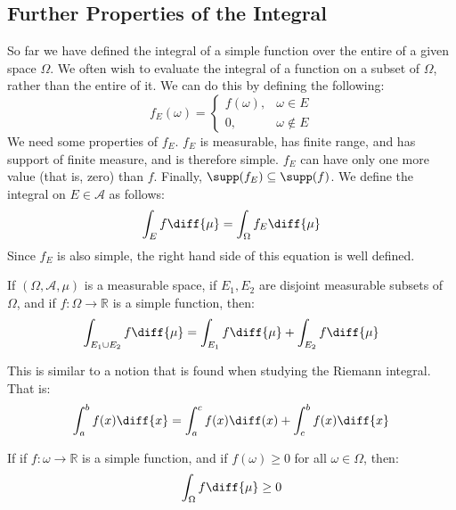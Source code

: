     \subsection{Further Properties of the Integral}
        So far we have defined the integral of a simple function over the
        entire of a given space $\Omega$. We often wish to evaluate the integral
        of a function on a subset of $\Omega$, rather than the entire of it. We
        can do this by defining the following:
        \begin{equation}
            f_{E}(\omega)=
            \begin{cases}
                f(\omega),&\omega\in{E}\\
                0,&\omega\notin{E}
            \end{cases}
        \end{equation}
        We need some properties of $f_{E}$. $f_{E}$ is measurable, has finite
        range, and has support of finite measure, and is therefore simple.
        $f_{E}$ can have only one more value (that is, zero) than $f$. Finally,
        $\supp(f_{E})\subseteq{\supp(f)}$. We define the integral on
        $E\in\mathcal{A}$ as follows:
        \begin{equation}
            \int_{E}f\diff{\mu}=\int_{\Omega}f_{E}\diff{\mu}
        \end{equation}
        Since $f_{E}$ is also simple, the right hand side of this equation is
        well defined.
        \begin{theorem}
            If $(\Omega,\mathcal{A},\mu)$ is a measurable space, if
            $E_{1},E_{2}$ are disjoint measurable subsets of $\Omega$, and if
            $f:\Omega\rightarrow\mathbb{R}$ is a simple function, then:
            \begin{equation}
                \int_{E_{1}\cup{E}_{2}}f\diff{\mu}=
                    \int_{E_{1}}f\diff{\mu}+\int_{E_{2}}f\diff{\mu}
            \end{equation}
        \end{theorem}
        This is similar to a notion that is found when studying the Riemann
        integral. That is:
        \begin{equation}
            \int_{a}^{b}f(x)\diff{x}
                =\int_{a}^{c}f(x)\diff(x)+\int_{c}^{b}f(x)\diff{x}
        \end{equation}
        \begin{theorem}
            If if $f:\omega\rightarrow\mathbb{R}$ is a simple function, and if
            $f(\omega)\geq{0}$ for all $\omega\in\Omega$, then:
            \begin{equation}
                \int_{\Omega}f\diff{\mu}\geq{0}
            \end{equation}
        \end{theorem}
